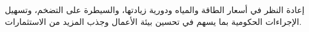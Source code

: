 إعادة النظر في أسعار الطاقة والمياه ودورية زيادتها، والسيطرة على التضخم، وتسهيل الإجراءات الحكومية بما يسهم في تحسين بيئة الأعمال وجذب المزيد من الاستثمارات.
